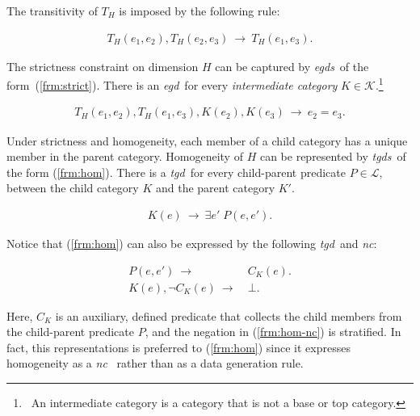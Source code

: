 \documentclass[format=acmsmall, review=false, screen=true]{acmart}
\newcommand{\mc}[1]{\mathcal{ #1}}
\newcommand{\nc}{{\em nc}}
\newcommand{\egds}{{\em egds}}
\newcommand{\egd}{{\em egd}}
\newcommand{\tgds}{{\em tgds}}
\newcommand{\tgd}{{\em tgd}}
\newcommand{\red}[1]{{#1}}
\begin{document}
{\noindent The transitivity of $T_H$ is imposed by the following rule:

\vspace{-4mm}
\begin{align}
T_H(e_1,e_2), T_H(e_2,e_3) ~\rightarrow~  T_H(e_1,e_3).\label{frm:trans}
\end{align}
\vspace{-4mm}

The strictness constraint on dimension $H$ can be captured by \egds \ of the form~(\ref{frm:strict}). There is an \egd \ for every {\em intermediate category} $K \in \mc{K}$.\footnote{\ An intermediate category is a category that is not a base or top category.}

\vspace{-4mm}
\begin{align}
T_H(e_1,e_2),T_H(e_1,e_3),K(e_2),K(e_3) ~\rightarrow~  e_2=e_3.\label{frm:strict}
\end{align}
\vspace{-4mm}


\red{Under strictness and homogeneity, each member of a child category has a unique member in the parent category.} Homogeneity of $H$ can be represented by \tgds \ of the form (\ref{frm:hom}). There is a \tgd \ for every child-parent predicate $P\in \mc{L}$, between the child category $K$ and the parent category $K'$.

\vspace{-4mm}
\begin{align}
K(e) ~\rightarrow~ \exists e'\;P(e,e').\label{frm:hom}
\end{align}
\vspace{-4mm}

\noindent Notice that (\ref{frm:hom}) can also be expressed by the following \tgd \ and \nc:

\vspace{-4mm}
\begin{align}
P(e,e') ~\rightarrow&~ C_K(e).\label{frm:hom-nc-pre}\\
K(e),\lnot C_K(e) ~\rightarrow&~ \bot.\label{frm:hom-nc}
\end{align}
\vspace{-4mm}

\noindent Here, $C_K$ is an \red{auxiliary, defined predicate} that collects the child members \red{from} the child-parent predicate $P$, and the negation in (\ref{frm:hom-nc}) is stratified. In fact, this representations is preferred to (\ref{frm:hom}) since it expresses homogeneity as \red{a \nc} \ rather than \red{as} a data generation rule.

}
\end{document}
